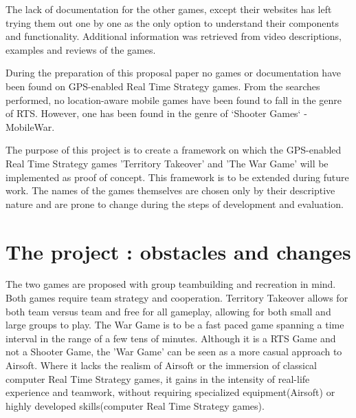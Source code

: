 \documentclass{article}
\begin{document}
The lack of documentation for the other games, except their websites has left
trying them out one by one as the only option to understand their components and
functionality. Additional information was retrieved from video descriptions,
examples and reviews of the games.\newline

During the preparation of this proposal paper no games or documentation have
been found on GPS-enabled Real Time Strategy games. From the searches performed,
no location-aware mobile games have been found to fall in the genre of RTS.
However, one has been found in the genre of `Shooter Games` - MobileWar.\newline

The purpose of this project is to create a framework on which the GPS-enabled
Real Time Strategy games 'Territory Takeover' and 'The War Game' will be
implemented as proof of concept. This framework is to be extended during future
work. The names of the games themselves are chosen only by their descriptive
nature and are prone to change during the steps of development and evaluation.

\section{The project : obstacles and changes}
The two games are proposed with group teambuilding and recreation in mind. Both
games require team strategy and cooperation. Territory Takeover allows for both
team versus team and free for all gameplay, allowing for both small and large
groups to play. The War Game is to be a fast paced game spanning a time interval
in the range of a few tens of minutes. Although it is a RTS Game and not a
Shooter Game, the 'War Game' can be seen as a more casual approach to Airsoft.
Where it lacks the realism of Airsoft or the immersion of classical computer
Real Time Strategy games, it gains in the intensity of real-life experience and
teamwork, without requiring specialized equipment(Airsoft) or highly developed
skills(computer Real Time Strategy games).
\end{document}
